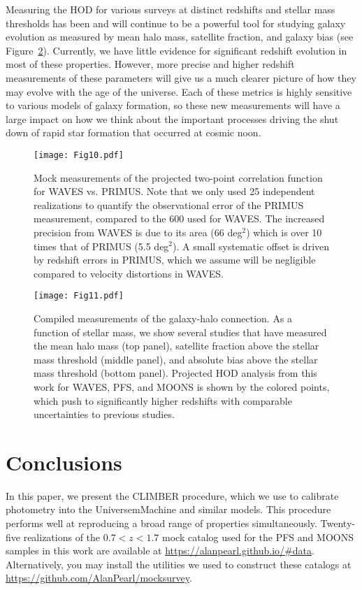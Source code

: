 \documentclass[twocolumn,twocolappendix]{aastex63}
\begin{document}
Measuring the HOD for various surveys at distinct redshifts and stellar mass thresholds has been and will continue to be a powerful tool for studying galaxy evolution as measured by mean halo mass, satellite fraction, and galaxy bias (see Figure~\ref{fig:compare-to-literature}). Currently, we have little evidence for significant redshift evolution in most of these properties. However, more precise and higher redshift measurements of these parameters will give us a much clearer picture of how they may evolve with the age of the universe. Each of these metrics is highly sensitive to various models of galaxy formation, so these new measurements will have a large impact on how we think about the important processes driving the shut down of rapid star formation that occurred at cosmic noon.

\begin{figure}
    \texttt{[image: Fig10.pdf]}
    \caption{Mock measurements of the projected two-point correlation function for WAVES vs. PRIMUS. Note that we only used 25 independent realizations to quantify the observational error of the PRIMUS measurement, compared to the 600 used for WAVES. The increased precision from WAVES is due to its area (66 deg$^2$) which is over 10 times that of PRIMUS (5.5 deg$^2$). A small systematic offset is driven by redshift errors in PRIMUS, which we assume will be negligible compared to velocity distortions in WAVES.
\label{fig:wp-waves-vs-primus}}
\end{figure}

\begin{figure}
    \texttt{[image: Fig11.pdf]}
    \caption{Compiled measurements of the galaxy-halo connection. As a function of stellar mass, we show several studies that have measured the mean halo mass (top panel), satellite fraction above the stellar mass threshold (middle panel), and absolute bias above the stellar mass threshold (bottom panel). Projected HOD analysis from this work for WAVES, PFS, and MOONS is shown by the colored points, which push to significantly higher redshifts with comparable uncertainties to previous studies.
    \label{fig:compare-to-literature}}
\end{figure}

\section{Conclusions}
\label{sec:conclusions}

In this paper, we present the CLIMBER procedure, which we use to calibrate photometry into the UniversemMachine and similar models. This procedure performs well at reproducing a broad range of properties simultaneously. Twenty-five realizations of the $0.7 < z < 1.7$ mock catalog used for the PFS and MOONS samples in this work are available at \url{https://alanpearl.github.io/\#data}. Alternatively, you may install the utilities we used to construct these catalogs at \url{https://github.com/AlanPearl/mocksurvey}.
\end{document}
